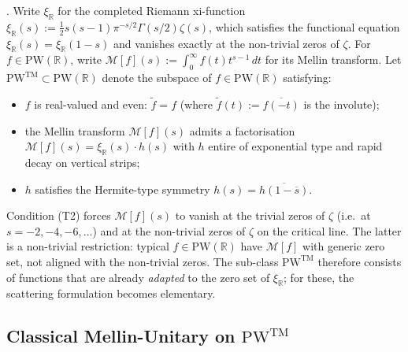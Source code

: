 \begin{definition}
\label{v4-arith:w7-j:def:TM-subclass}
\ClaimStatusDefinitional. Write \(\xi_{\mathbb{R}}\) for the completed
Riemann xi-function \(\xi_{\mathbb{R}}(s):=\tfrac{1}{2}s(s-1)\pi^{-s/2}
\Gamma(s/2)\zeta(s)\), which satisfies the functional equation
\(\xi_{\mathbb{R}}(s)=\xi_{\mathbb{R}}(1-s)\) and vanishes exactly at
the non-trivial zeros of \(\zeta\). For \(f\in\mathrm{PW}(\mathbb{R})\),
write \(\mathcal{M}[f](s):=\int_{0}^{\infty}f(t)t^{s-1}\,dt\) for its
Mellin transform. Let
\(\mathrm{PW}^{\mathrm{TM}}\subset\mathrm{PW}(\mathbb{R})\) denote the
subspace of \(f\in\mathrm{PW}(\mathbb{R})\) satisfying:
\begin{itemize}
\item[(T1)] \(f\) is real-valued and even: \(\widetilde{f}=f\) (where
\(\widetilde{f}(t):=\overline{f(-t)}\) is the involute);
\item[(T2)] the Mellin transform \(\mathcal{M}[f](s)\) admits a
factorisation
\(\mathcal{M}[f](s)=\xi_{\mathbb{R}}(s)\cdot h(s)\) with \(h\) entire
of exponential type and rapid decay on vertical strips;
\item[(T3)] \(h\) satisfies the Hermite-type symmetry
\(h(s)=\overline{h(1-\overline{s})}\).
\end{itemize}
\end{definition}

\begin{remark}
\label{v4-arith:w7-j:rem:T2-restriction}
Condition (T2) forces \(\mathcal{M}[f](s)\) to vanish at the
trivial zeros of \(\zeta\) (i.e.\ at \(s=-2,-4,-6,\ldots\)) and at the
non-trivial zeros of \(\zeta\) on the critical line. The latter is a
non-trivial restriction: typical \(f\in\mathrm{PW}(\mathbb{R})\) have
\(\mathcal{M}[f]\) with generic zero set, not aligned with the
non-trivial zeros. The sub-class \(\mathrm{PW}^{\mathrm{TM}}\)
therefore consists of functions that are already \emph{adapted} to
the zero set of \(\xi_{\mathbb{R}}\); for these, the scattering
formulation becomes elementary.
\end{remark}

\subsection{Classical Mellin-Unitary on \(\mathrm{PW}^{\mathrm{TM}}\)}
\label{v4-arith:w7-j:classical-mellin}

